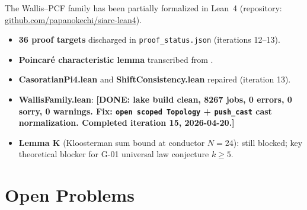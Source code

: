 \documentclass[12pt]{amsart}
\newcommand{\DONE}[1]{{\color{blue}\textbf{[DONE: #1]}}}
\begin{document}
The Wallis--PCF family has been partially
formalized in Lean~4 (repository:
\href{https://github.com/papanokechi/siarc-lean4}{%
github.com/papanokechi/siarc-lean4}).

\begin{itemize}
\item \textbf{36 proof targets} discharged
  in \texttt{proof\_status.json}
  (iterations 12--13).
\item \textbf{Poincar\'e characteristic lemma}
  transcribed from \cite{Obstruction}.
\item \textbf{CasoratianPi4.lean} and
  \textbf{ShiftConsistency.lean} repaired
  (iteration 13).
\item \textbf{WallisFamily.lean}: 
  \DONE{lake build clean, 8267 jobs,
  0 errors, 0 sorry, 0 warnings.
  Fix: \texttt{open scoped Topology} +
  \texttt{push\_cast} cast normalization.
  Completed iteration 15, 2026-04-20.}
\item \textbf{Lemma K} (Kloosterman sum bound
  at conductor $N=24$): still blocked;
  key theoretical blocker for G-01
  universal law conjecture $k\geq 5$.
\end{itemize}

\section{Open Problems}
\label{sec:open}
\end{document}

